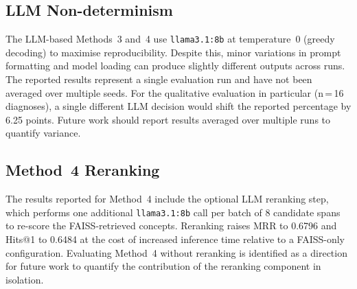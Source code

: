 \subsection{LLM Non-determinism}

The LLM-based Methods~3 and~4 use \texttt{llama3.1:8b} at temperature~0 (greedy decoding) to maximise reproducibility. Despite this, minor variations in prompt formatting and model loading can produce slightly different outputs across runs. The reported results represent a single evaluation run and have not been averaged over multiple seeds. For the qualitative evaluation in particular (n\,=\,16 diagnoses), a single different LLM decision would shift the reported percentage by 6.25 points. Future work should report results averaged over multiple runs to quantify variance.

\subsection{Method~4 Reranking}

The results reported for Method~4 include the optional LLM reranking step, which performs one additional \texttt{llama3.1:8b} call per batch of 8 candidate spans to re-score the FAISS-retrieved concepts. Reranking raises MRR to 0.6796 and Hits@1 to 0.6484 at the cost of increased inference time relative to a FAISS-only configuration. Evaluating Method~4 without reranking is identified as a direction for future work to quantify the contribution of the reranking component in isolation.
